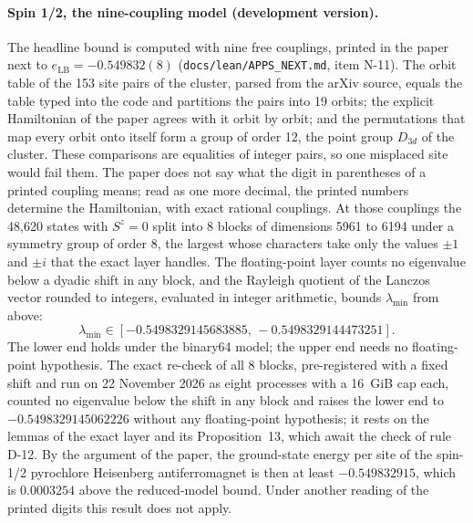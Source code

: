 \documentclass[11pt,a4paper]{article}
\newif\ifshowCrownComparison
\newcommand{\code}[1]{\texttt{#1}}
\begin{document}
\paragraph{Spin 1/2, the nine-coupling model (development version).}
The headline bound is computed with nine free couplings, printed in the paper next to $e_{\mathrm{LB}}=-0.549832(8)$
(\code{docs/lean/APPS\_NEXT.md}, item N-11). The orbit table of the 153 site pairs of the cluster, parsed from the arXiv
source, equals the table typed into the code and partitions the pairs into 19 orbits; the explicit Hamiltonian of the
paper agrees with it orbit by orbit; and the permutations that map every orbit onto itself form a group of order 12,
the point group $D_{3d}$ of the cluster. These comparisons are equalities of integer pairs, so one misplaced site would
fail them. The paper does not say what the digit in parentheses of a printed coupling means; read as one more decimal,
the printed numbers determine the Hamiltonian, with exact rational couplings. At those couplings the 48,620 states
with $S^z=0$ split into 8 blocks of dimensions 5961 to 6194 under a symmetry group of order 8, the largest whose
characters take only the values $\pm1$ and $\pm i$ that the exact layer handles. The floating-point layer counts no
eigenvalue below a dyadic shift in any block, and the Rayleigh quotient of the Lanczos vector rounded to integers,
evaluated in integer arithmetic, bounds $\lambda_{\min}$ from above:
\begin{equation}
\lambda_{\min}\in[-0.5498329145683885,\,-0.5498329144473251].
\end{equation}
The lower end holds under the binary64 model; the upper end needs no floating-point hypothesis. The exact re-check of
all 8 blocks, pre-registered with a fixed shift and run on 22 November 2026 as eight processes with a 16~GiB cap each,
counted no eigenvalue below the shift in any block and raises the lower end to $-0.5498329145062226$ without any
floating-point hypothesis; it rests on the lemmas of the exact layer and its Proposition~13, which await the check of
rule D-12. By the argument of the paper, the ground-state energy per site of the spin-1/2 pyrochlore Heisenberg
antiferromagnet is then at least $-0.549832915$, which is $0.0003254$ above the reduced-model bound. Under another
reading of the printed digits this result does not apply.

\ifshowCrownComparison
The printed headline lies above this enclosure: read with its digit, $-0.5498328$ exceeds the lower bound by
$1.145\times10^{-7}$, and the six decimals $-0.549832$ of the abstract of \cite{KranitzPenc2026} exceed it by
$9.145\times10^{-7}$. The printed values are the first digits of the eigenvalue, cut toward zero rather than rounded
down, which for a lower bound overstates it by less than $10^{-6}$; the same holds for the reduced-model value
$-0.550158(2)$ against $-0.5501582988212038$. A six-decimal statement that holds at the printed couplings is
$e_{\mathrm{GS}}\ge-0.549833$.
\fi
\end{document}
